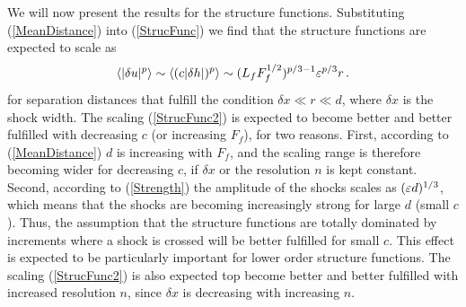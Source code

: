 We will now present the results for the structure functions. Substituting
(\ref{MeanDistance}) into (\ref{StrucFunc}) we find that the structure
functions are expected to scale as
\begin{equation} \label{StrucFunc2}
\langle |\delta u |^p \rangle  \sim \langle (c|\delta h |)^p \rangle \sim  (L_f F_f^{1/2})^{p/3-1}  \varepsilon^{p/3}  r  \, .
\end{equation}
for separation distances that fulfill the condition $ \delta x \ll r \ll d $,
where $ \delta x $ is the shock width. The scaling (\ref{StrucFunc2}) is
expected to become better and better fulfilled with decreasing $ c $ (or
increasing $ F_f $), for two reasons. First, according to (\ref{MeanDistance})
$ d $ is increasing with $ F_f $, and the scaling range is therefore becoming
wider for decreasing $ c $, if $ \delta x $ or the resolution $ n $ is kept
constant. Second, according to (\ref{Strength}) the amplitude of the shocks
scales as $ (\varepsilon d)^{1/3} $, which means that the shocks are becoming
increasingly strong for large $ d $ (small $ c $). Thus, the assumption that
the structure functions are totally dominated by increments where a shock is
crossed will be better fulfilled for small $ c $. This effect is expected to be
particularly important for lower order structure functions. The scaling
(\ref{StrucFunc2}) is also expected top become better and better fulfilled with
increased resolution $ n $, since $ \delta x $ is decreasing with increasing $
n $.

